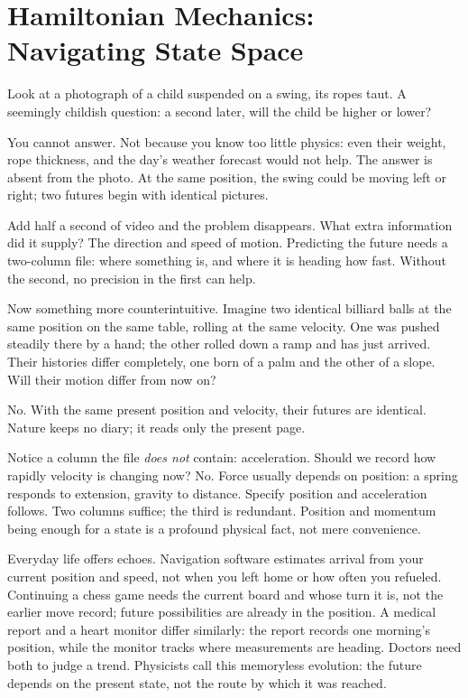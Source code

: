 \chapter{Hamiltonian Mechanics: Navigating State Space}


\begin{mainline}
Look at a photograph of a child suspended on a swing, its ropes taut. A seemingly childish question: a second later, will the child be higher or lower?

You cannot answer. Not because you know too little physics: even their weight, rope thickness, and the day's weather forecast would not help. The answer is absent from the photo. At the same position, the swing could be moving left or right; two futures begin with identical pictures.

Add half a second of video and the problem disappears. What extra information did it supply? The direction and speed of motion. Predicting the future needs a two-column file: where something is, and where it is heading how fast. Without the second, no precision in the first can help.

Now something more counterintuitive. Imagine two identical billiard balls at the same position on the same table, rolling at the same velocity. One was pushed steadily there by a hand; the other rolled down a ramp and has just arrived. Their histories differ completely, one born of a palm and the other of a slope. Will their motion differ from now on?

No. With the same present position and velocity, their futures are identical. Nature keeps no diary; it reads only the present page.

Notice a column the file \emph{does not} contain: acceleration. Should we record how rapidly velocity is changing now? No. Force usually depends on position: a spring responds to extension, gravity to distance. Specify position and acceleration follows. Two columns suffice; the third is redundant. Position and momentum being enough for a state is a profound physical fact, not mere convenience.

Everyday life offers echoes. Navigation software estimates arrival from your current position and speed, not when you left home or how often you refueled. Continuing a chess game needs the current board and whose turn it is, not the earlier move record; future possibilities are already in the position. A medical report and a heart monitor differ similarly: the report records one morning's position, while the monitor tracks where measurements are heading. Doctors need both to judge a trend. Physicists call this memoryless evolution: the future depends on the present state, not the route by which it was reached.


\end{mainline}
